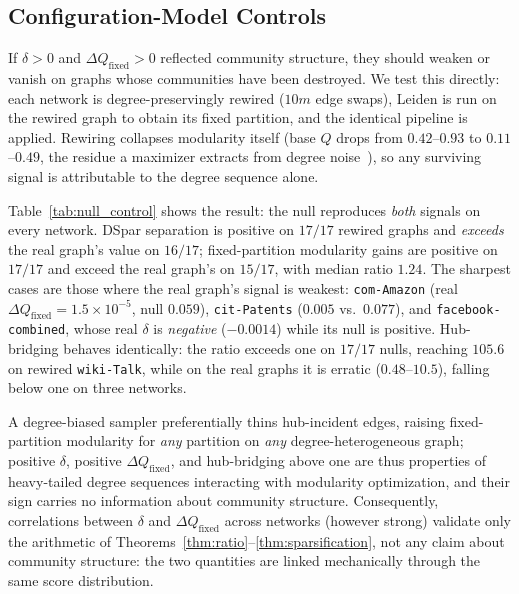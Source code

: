\documentclass[10pt,journal,compsoc]{IEEEtran}
\begin{document}
\subsection{Configuration-Model Controls}
\label{sec:mech-null}

If $\delta > 0$ and $\Delta Q_{\mathrm{fixed}} > 0$ reflected community structure, they should weaken or vanish on graphs whose communities have been destroyed.
We test this directly: each network is degree-preservingly rewired ($10m$ edge swaps), Leiden is run on the rewired graph to obtain its fixed partition, and the identical pipeline is applied.
Rewiring collapses modularity itself (base $Q$ drops from $0.42$--$0.93$ to $0.11$--$0.49$, the residue a maximizer extracts from degree noise~\cite{guimera2004modularity}), so any surviving signal is attributable to the degree sequence alone.



Table~\ref{tab:null_control} shows the result: the null reproduces \emph{both} signals on every network.
DSpar separation is positive on $17/17$ rewired graphs and \emph{exceeds} the real graph's value on $16/17$; fixed-partition modularity gains are positive on $17/17$ and exceed the real graph's on $15/17$, with median ratio $1.24$.
The sharpest cases are those where the real graph's signal is weakest: \texttt{com-Amazon} (real $\Delta Q_{\mathrm{fixed}} = 1.5\times10^{-5}$, null $0.059$), \texttt{cit-Patents} ($0.005$ vs.\ $0.077$), and \texttt{facebook-combined}, whose real $\delta$ is \emph{negative} ($-0.0014$) while its null is positive.
Hub-bridging behaves identically: the ratio exceeds one on $17/17$ nulls, reaching $105.6$ on rewired \texttt{wiki-Talk}, while on the real graphs it is erratic ($0.48$--$10.5$), falling below one on three networks.

A degree-biased sampler preferentially thins hub-incident edges, raising fixed-partition modularity for \emph{any} partition on \emph{any} degree-heterogeneous graph; positive $\delta$, positive $\Delta Q_{\mathrm{fixed}}$, and hub-bridging above one are thus properties of heavy-tailed degree sequences interacting with modularity optimization, and their sign carries no information about community structure.
Consequently, correlations between $\delta$ and $\Delta Q_{\mathrm{fixed}}$ across networks (however strong) validate only the arithmetic of Theorems~\ref{thm:ratio}--\ref{thm:sparsification}, not any claim about community structure: the two quantities are linked mechanically through the same score distribution.
\end{document}
